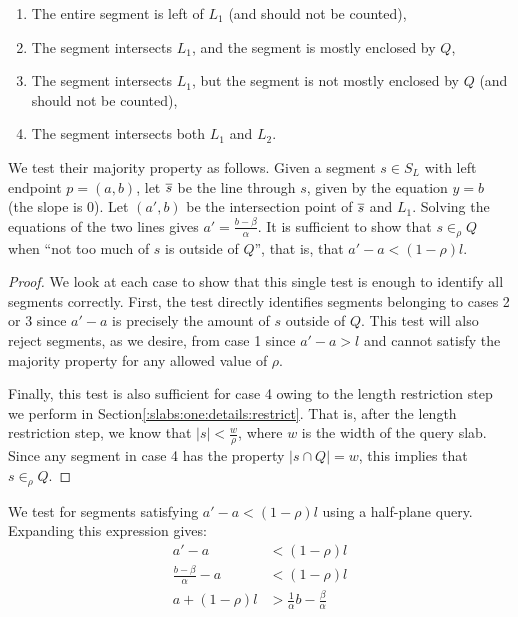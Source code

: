 \begin{enumerate}
 \item The entire segment is left of $L_1$ (and should not be counted),

 \item The segment intersects $L_1$, and the segment is mostly enclosed by $Q$,

 \item The segment intersects $L_1$, but the segment is not mostly enclosed by $Q$ (and should not be counted),

 \item The segment intersects both $L_1$ and $L_2$. 

\end{enumerate}

We test their majority property as follows. 
Given a segment $s \in S_L$ with left endpoint $p = (a,b)$, let $\overline{s}$ be the line through $s$, given by the equation $y = b$ (the slope is 0). 
Let $(a', b)$ be the intersection point of $\overline{s}$ and $L_1$. 
Solving the equations of the two lines gives $a' = \frac{b - \beta}{\alpha}$. 
It is sufficient to show that $s \in_\rho Q$ when ``not too much of $s$ is outside of $Q$'', that is, that $a' - a < (1 - \rho)l$. 

\begin{proof}
We look at each case to show that this single test is enough to identify all segments correctly. 
First, the test directly identifies segments belonging to cases 2 or 3 since $a' - a$ is precisely the amount of $s$ outside of $Q$. This test will also reject segments, as we desire, from case 1 since $a' - a > l$ and cannot satisfy the majority property for any allowed value of $\rho$. 

Finally, this test is also sufficient for case 4 owing to the length restriction step we perform in Section\ref{:slabs:one:details:restrict}. That is, after the length restriction step, we know that $|s| < \frac{w}{\rho}$, where $w$ is the width of the query slab. Since any segment in case 4 has the property $|s \cap Q| = w$, this implies that $s \in_\rho Q$.
\end{proof}

We test for segments satisfying $a' - a < (1 - \rho)l$ using a half-plane query. Expanding this expression gives:
\[
\begin{split}
a' - a &< (1 - \rho)l \\
%
\frac{b - \beta}{\alpha} - a &< (1 - \rho)l \\
%
a + (1 - \rho)l &> \frac{1}{\alpha} b - \frac{\beta}{\alpha}  \\
\end{split}
\]

